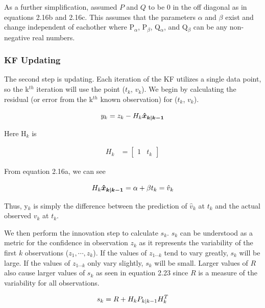   As a further simplification, assumed $P$ and $Q$ to be 0 in the off diagonal as in equations 2.16b and 2.16c. This assumes that the parameters $\alpha$ and $\beta$ exist and change independent of eachother where  P$_{\alpha}$,  P$_{\beta}$, Q$_{\alpha}$, and Q$_{\beta}$ can be any non-negative real numbers.
 
 \subsubsection{KF Updating}
 
  The second step is updating. Each iteration of the KF utilizes a single data point, so the k$^{th}$ iteration will use the point ($t_{k}$, $v_{k}$). We begin by calculating the residual (or error from the k$^{th}$ known observation) for ($t_{k}$, $v_{k}$).
  
  \begin{equation}
  \centering
  y_{k} = z_{k} - H_{k}\bm{\hat{x}_{k|k-1}}
  \end{equation}
  
  Here H$_{k}$ is
  
  \begin{align}
    H_{k} &= \begin{bmatrix}
           1&t_{k}
         \end{bmatrix}
  \end{align}
  
  From equation 2.16a, we can see 
  
  \begin{equation}
  \centering
    H_{k}\bm{\hat{x}_{k|k-1}} = \alpha + \beta t_{k} = \hat{v}_{k}
  \end{equation}
  
  Thus, y$_{k}$ is simply the difference between the prediction of $\hat{v}_{k}$ at $t_{k}$ and the actual observed $v_{k}$ at $t_{k}$.
  
  We then perform the innovation step to calculate $s_{k}$. $s_{k}$ can be understood as a metric for the confidence in observation $z_{k}$ as it represents the variability of the first $k$ observations ($z_{1}, \cdots , z_{k}$). If the values of $z_{1 \cdots k}$ tend to vary greatly, $s_{k}$ will be large. If the values of $z_{1 \cdots k}$ only vary slightly, $s_{k}$ will be small. Larger values of $R$ also cause larger values of $s_{k}$ as seen in equation 2.23 since $R$ is a measure of the variability for all observations.
  
  \begin{equation}
  \centering
    s_{k} = R + H_{k}P_{k|k-1}H_{k}^{T}
  \end{equation}
  
